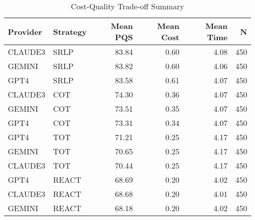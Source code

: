 \begin{table}[htbp]
\centering
\caption{Cost-Quality Trade-off Summary}
\label{tab:cost_quality}
\begin{tabular}{llrrrr}
\toprule
Provider & Strategy & Mean PQS & Mean Cost & Mean Time & N \\
\midrule
CLAUDE3 & SRLP & 83.84 & 0.60 & 4.08 & 450 \\
GEMINI & SRLP & 83.82 & 0.60 & 4.06 & 450 \\
GPT4 & SRLP & 83.58 & 0.61 & 4.07 & 450 \\
CLAUDE3 & COT & 74.30 & 0.36 & 4.07 & 450 \\
GEMINI & COT & 73.51 & 0.35 & 4.07 & 450 \\
GPT4 & COT & 73.31 & 0.34 & 4.07 & 450 \\
GPT4 & TOT & 71.21 & 0.25 & 4.17 & 450 \\
GEMINI & TOT & 70.65 & 0.25 & 4.17 & 450 \\
CLAUDE3 & TOT & 70.44 & 0.25 & 4.17 & 450 \\
GPT4 & REACT & 68.69 & 0.20 & 4.02 & 450 \\
CLAUDE3 & REACT & 68.68 & 0.20 & 4.01 & 450 \\
GEMINI & REACT & 68.18 & 0.20 & 4.02 & 450 \\
\bottomrule
\end{tabular}
\end{table}